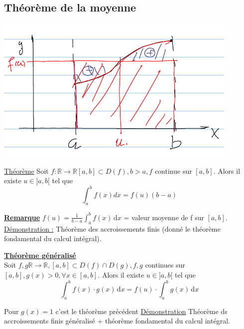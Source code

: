 \documentclass[12pt,a4paper]{article}
\newcommand{\evid}[1]{\textbf{\underline{#1}}}
\newcommand{\R}{\ensuremath{\mathbb{R}} }
\newcommand{\rtor}{\ensuremath{\R \to \R} }
\newcommand{\Theoreme}{\underline{Théorème} }
\begin{document}
{\subsection{Théorème de la moyenne}
\includegraphics[scale=0.5]{illustrations_analyse/theo_moyenne}\\
\begin{boite}
\Theoreme Soit $f: \rtor [a,b] \subset D(f), b>a, f$ continue sur $[a,b]$. Alors il existe $u \in ]a,b[$ tel que 
\begin{equation}
\int_a^b f(x) dx = f(u)(b-a)
\end{equation}
\end{boite}
\evid{Remarque} $f(u) = \frac{1}{b-a}\int_a^bf(x) \, \mathrm dx$ = valeur moyenne de f sur $[a,b]$.\\
\underline{Démonstration :} Théorème des accroissements finis (donné le théorème fondamental du calcul intégral).\\
\begin{boite}
	\evid{Théorème généralisé}\\
	Soit $f,g \rtor, [a,b] \subset D(f) \cap D(g), f,g$ continues sur $[a,b], g(x) > 0, \forall x \in [a,b]$. Alors il existe $u \in]a,b[$ tel que
	\begin{equation}
		\int_a^b f(x) \cdot g(x) \, \mathrm{d}x = f(u) \cdot \int_a^bg(x) \, \mathrm dx
	\end{equation}	 
\end{boite}
Pour $g(x) = 1$ c'est le théorème précédent
\underline{Démonstration} Théorème ds accroissements finis généralisé  + théorème fondamental du calcul intégral.
}
\end{document}
